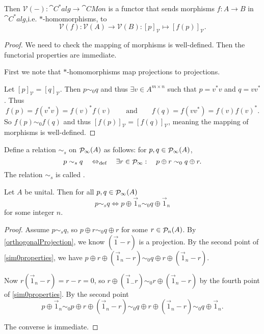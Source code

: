 \begin{lemma}
Then $\mathcal{V}(-): \cat{C^*alg} \to \cat{CMon}$ is a functor that sends morphisms $f: A \to B$ in $\cat{C^*alg}$,i.e. $*$-homomorphisms, to
\[  \mathcal{V}(f):\mathcal{V}(A) \to \mathcal{V}(B): [p]_\mathcal{V} \mapsto [f(p)]_\mathcal{V}. \]
\end{lemma}
\begin{proof}
We need to check the mapping of morphisms is well-defined. Then the functorial properties are immediate.

First we note that $*$-homomorphisms map projections to projections.

Let $[p]_\mathcal{V} = [q]_\mathcal{V}$. Then $p\sim_0 q$ and thus $\exists v\in A^{m\times n}$ such that $p=v^*v$ and $q = vv^*$. Thus
\[ f(p) = f(v^*v) = f(v)^*f(v) \qquad \text{and}\qquad f(q) = f(vv^*) = f(v)f(v)^*. \]
So $f(p) \sim_0 f(q)$ and thus $[f(p)]_\mathcal{V} = [f(q)]_\mathcal{V}$, meaning the mapping of morphisms is well-defined.
\end{proof}

\begin{definition}
Define a relation $\sim_s$ on $\mathop{\mathcal{P}}\nolimits_\infty(A)$ as follows: for $p,q\in\mathop{\mathcal{P}}\nolimits_\infty(A)$,
\[ p\sim_s q \quad\Leftrightarrow_{\text{def}}\quad \exists r\in\mathop{\mathcal{P}}\nolimits_\infty:\quad p\oplus r \sim_0 q\oplus r. \]
The relation $\sim_s$ is called .
\end{definition}

\begin{lemma} \label{stableEquivalence}
Let $A$ be unital. Then for all $p,q\in\mathop{\mathcal{P}}\nolimits_\infty(A)$
\[ p\sim_s q \iff p\oplus \vec{1}_n \sim_0 q\oplus \vec{1}_n \]
for some integer $n$.
\end{lemma}
\begin{proof}
Assume $ p\sim_s q$, so $p\oplus r \sim_0 q\oplus r$ for some $r\in\mathop{\mathcal{P}}\nolimits_n(A)$. By \ref{orthogonalProjection}, we know $(\vec{1}-r)$ is a projection. By the second point of \ref{sim0properties}, we have $p\oplus r \oplus (\vec{1}_n - r) \sim_0 q\oplus r \oplus (\vec{1}_n - r)$.

Now $r(\vec{1}_n - r) = r-r = 0$, so $r\oplus(\vec{1}_ - r) \sim_0 r\oplus(\vec{1}_n - r)$ by the fourth point of \ref{sim0properties}. By the second point
\[ p\oplus \vec{1}_n \sim_0 p\oplus r \oplus (\vec{1}_n - r) \sim_0 q\oplus r \oplus (\vec{1}_n - r) \sim_0 q\oplus \vec{1}_n. \]

The converse is immediate.
\end{proof}

